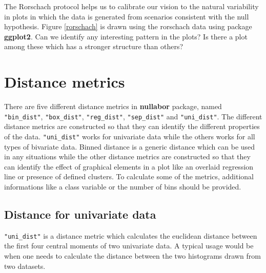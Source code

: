 The Rorschach protocol helps us to calibrate our vision to the natural variability in plots in which the data is generated from scenarios consistent with the null hypothesis. Figure \ref{rorschach} is drawn using the rorschach data using package \textbf{ggplot2}. Can we identify any interesting pattern in the plots? Is there a plot among these which has a stronger structure than others?

\section{Distance metrics}\label{distance-metrics}

There are five different distance metrics in \textbf{nullabor} package,
named \texttt{"bin\_dist"}, \texttt{"box\_dist"}, \texttt{"reg\_dist"},
\texttt{"sep\_dist"} and \texttt{"uni\_dist"}. The different distance
metrics are constructed so that they can identify the different
properties of the data. \texttt{"uni\_dist"} works for univariate data
while the others works for all types of bivariate data. Binned distance
is a generic distance which can be used in any situations while the
other distance metrics are constructed so that they can identify the
effect of graphical elements in a plot like an overlaid regression line
or presence of defined clusters. To calculate some of the metrics,
additional informations like a class variable or the number of bins
should be provided.

\subsection{Distance for univariate
data}\label{distance-for-univariate-data}

\texttt{"uni\_dist"} is a distance metric which calculates the euclidean
distance between the first four central moments of two univariate data.
A typical usage would be when one needs to calculate the distance
between the two histograms drawn from two datasets.

%

